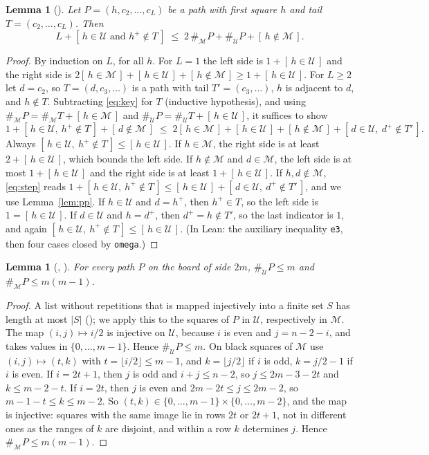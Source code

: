 \documentclass[11pt]{amsart}
\theoremstyle{plain}
\newtheorem{lemma}[theorem]{Lemma}
\theoremstyle{definition}
\newcommand{\Ib}[1]{[\,#1\,]}
\newcommand{\cM}{\mathcal{M}}
\newcommand{\cU}{\mathcal{U}}
\begin{document}
\begin{lemma}[]\label{lem:key}
Let $P=(h,c_2,\dots,c_L)$ be a path with first square $h$ and tail $T=(c_2,\dots,c_L)$. Then
\begin{equation}\label{eq:key}
  L+\Ib{h\in\cU\text{ and }h^+\notin T}\;\le\;2\,\#_\cM P+\#_\cU P+\Ib{h\notin\cM}.
\end{equation}
\end{lemma}

\begin{proof}
By induction on $L$, for all $h$. For $L=1$ the left side is $1+\Ib{h\in\cU}$ and the right side is $2\Ib{h\in\cM}+\Ib{h\in\cU}+\Ib{h\notin\cM}\ge1+\Ib{h\in\cU}$.
For $L\ge2$ let $d=c_2$, so $T=(d,c_3,\dots)$ is a path with tail $T'=(c_3,\dots)$, $h$ is adjacent to $d$, and $h\notin T$. Subtracting \eqref{eq:key} for $T$ (inductive hypothesis), and using $\#_\cM P=\#_\cM T+\Ib{h\in\cM}$ and $\#_\cU P=\#_\cU T+\Ib{h\in\cU}$, it suffices to show
\begin{equation}\label{eq:step}
  1+\Ib{h\in\cU,\ h^+\notin T}+\Ib{d\notin\cM}\;\le\;2\Ib{h\in\cM}+\Ib{h\in\cU}+\Ib{h\notin\cM}+\Ib{d\in\cU,\ d^+\notin T'}.
\end{equation}
Always $\Ib{h\in\cU,\ h^+\notin T}\le\Ib{h\in\cU}$. If $h\in\cM$, the right side is at least $2+\Ib{h\in\cU}$, which bounds the left side. If $h\notin\cM$ and $d\in\cM$, the left side is at most $1+\Ib{h\in\cU}$ and the right side is at least $1+\Ib{h\in\cU}$. If $h,d\notin\cM$, \eqref{eq:step} reads $1+\Ib{h\in\cU,\ h^+\notin T}\le\Ib{h\in\cU}+\Ib{d\in\cU,\ d^+\notin T'}$, and we use Lemma~\ref{lem:pp}. If $h\in\cU$ and $d=h^+$, then $h^+\in T$, so the left side is $1=\Ib{h\in\cU}$. If $d\in\cU$ and $h=d^+$, then $d^+=h\notin T'$, so the last indicator is $1$, and again $\Ib{h\in\cU,\ h^+\notin T}\le\Ib{h\in\cU}$. (In Lean: the auxiliary inequality \texttt{e3}, then four cases closed by \texttt{omega}.)
\end{proof}

\begin{lemma}[, ]\label{lem:count}
For every path $P$ on the board of side $2m$, $\#_\cU P\le m$ and $\#_\cM P\le m(m-1)$.
\end{lemma}

\begin{proof}
A list without repetitions that is mapped injectively into a finite set $S$ has length at most $|S|$ (); we apply this to the squares of $P$ in $\cU$, respectively in $\cM$.
The map $(i,j)\mapsto i/2$ is injective on $\cU$, because $i$ is even and $j=n-2-i$, and takes values in $\{0,\dots,m-1\}$. Hence $\#_\cU P\le m$.
On black squares of $\cM$ use $(i,j)\mapsto(t,k)$ with $t=\lfloor i/2\rfloor\le m-1$, and $k=\lfloor j/2\rfloor$ if $i$ is odd, $k=j/2-1$ if $i$ is even. If $i=2t+1$, then $j$ is odd and $i+j\le n-2$, so $j\le 2m-3-2t$ and $k\le m-2-t$. If $i=2t$, then $j$ is even and $2m-2t\le j\le 2m-2$, so $m-1-t\le k\le m-2$. So $(t,k)\in\{0,\dots,m-1\}\times\{0,\dots,m-2\}$, and the map is injective: squares with the same image lie in rows $2t$ or $2t+1$, not in different ones as the ranges of $k$ are disjoint, and within a row $k$ determines $j$. Hence $\#_\cM P\le m(m-1)$.
\end{proof}
\end{document}
